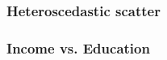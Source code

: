 \documentclass[handout]{beamer}
\begin{document}


   \begin{frame}
   \frametitle{Heteroscedastic scatter}
   \begin{center}
   \end{center}

   \end{frame}



   \begin{frame}
   \frametitle{Income vs. Education}
   \begin{center}
   \end{center}

   \end{frame}

\end{document}
